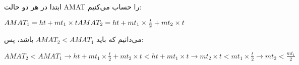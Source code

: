ابتدا در هر دو حالت AMAT را حساب می‌کنیم:

\setLTR
$
AMAT_1 = ht + mt_1 \times t \\
AMAT_2 = ht + mt_1 \times \frac{t}{2}  + mt_2 \times t
$
\setRTL

می‌دانیم که باید 
$AMAT_2 < AMAT_1$
باشد، پس:

\setLTR
$
AMAT_2 < AMAT_1 \longrightarrow ht + mt_1 \times \frac{t}{2} + mt_2 \times t < ht + mt_1 \times t \longrightarrow mt_2\times t < mt_1 \times  \frac{t}{2} \longrightarrow mt_2 < \frac{mt_1}{2} 
$
\setRTL

